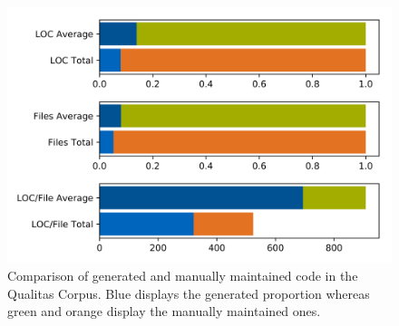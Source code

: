 
\begin{figure}
	\centering
	\includegraphics[width=\linewidth]{figures/QualitasCorpusComparison/comparison.png}
	\caption[Comparison of generated and manually maintained code in the Qualitas Corpus]{Comparison of generated and manually maintained code in the Qualitas Corpus.	Blue displays the generated proportion whereas green and orange display the manually maintained ones.
		}
	\label{fig:comparison}
\end{figure}
